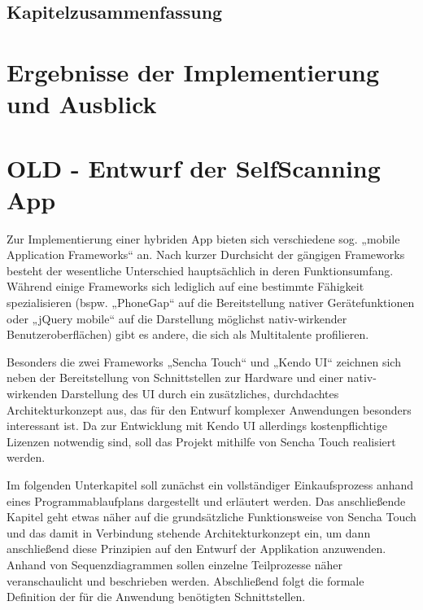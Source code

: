 \section{Kapitelzusammenfassung}

\chapter{Ergebnisse der Implementierung und Ausblick}



\chapter{OLD - Entwurf der SelfScanning App}
Zur Implementierung einer hybriden App bieten sich verschiedene sog. „mobile Application Frameworks“ an. Nach kurzer Durchsicht der gängigen Frameworks besteht der wesentliche Unterschied hauptsächlich in deren Funktionsumfang. Während einige Frameworks sich lediglich auf eine bestimmte Fähigkeit spezialisieren (bspw. „PhoneGap“ auf die Bereitstellung nativer Gerätefunktionen oder „jQuery mobile“ auf die Darstellung möglichst nativ-wirkender Benutzeroberflächen) gibt es andere, die sich als Multitalente profilieren. 

Besonders die zwei Frameworks „Sencha Touch“ und „Kendo UI“ zeichnen sich neben der Bereitstellung von Schnittstellen zur Hardware und einer nativ-wirkenden Darstellung des UI durch ein zusätzliches, durchdachtes Architekturkonzept aus, das für den Entwurf komplexer Anwendungen besonders interessant ist. Da zur Entwicklung mit Kendo UI allerdings kostenpflichtige Lizenzen notwendig sind, soll das Projekt mithilfe von Sencha Touch realisiert werden.

Im folgenden Unterkapitel soll zunächst ein vollständiger Einkaufsprozess anhand eines Programmablaufplans dargestellt und erläutert werden. Das anschließende Kapitel geht etwas näher auf die grundsätzliche Funktionsweise von Sencha Touch und das damit in Verbindung stehende Architekturkonzept ein, um dann anschließend diese Prinzipien auf den Entwurf der Applikation anzuwenden. Anhand von Sequenzdiagrammen sollen einzelne Teilprozesse näher veranschaulicht und beschrieben werden. Abschließend folgt die formale Definition der für die Anwendung benötigten Schnittstellen.


% 
%
\seAppendix{}

